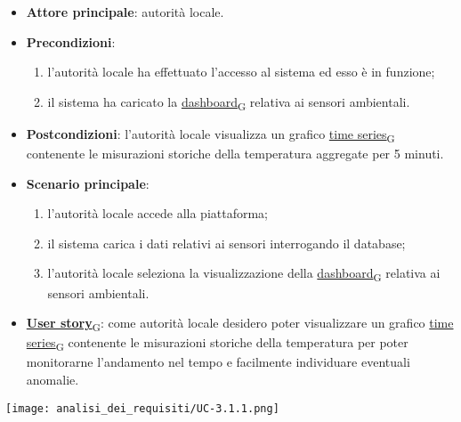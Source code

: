 \begin{itemize}
	\item \textbf{Attore principale}: autorità locale.
	\item \textbf{Precondizioni}:
	      \begin{enumerate}
		      \item l'autorità locale ha effettuato l'accesso al sistema ed esso è in funzione;
		      \item il sistema ha caricato la \href{https://7last.github.io/docs/pb/documentazione-interna/glossario\#dashboard}{dashboard\textsubscript{G}} relativa ai sensori ambientali.
	      \end{enumerate}
	\item \textbf{Postcondizioni}: l'autorità locale visualizza un grafico \href{https://7last.github.io/docs/pb/documentazione-interna/glossario\#time-series}{time series\textsubscript{G}} contenente le misurazioni storiche
	      della temperatura aggregate per 5 minuti.
	\item \textbf{Scenario principale}:
	      \begin{enumerate}
		      \item l'autorità locale accede alla piattaforma;
		      \item il sistema carica i dati relativi ai sensori interrogando il database;
		      \item l'autorità locale seleziona la visualizzazione della \href{https://7last.github.io/docs/pb/documentazione-interna/glossario\#dashboard}{dashboard\textsubscript{G}} relativa ai sensori ambientali.
	      \end{enumerate}
	\item \href{https://7last.github.io/docs/pb/documentazione-interna/glossario\#user-story}{\textbf{User story}\textsubscript{G}}: come autorità locale desidero poter visualizzare un grafico \href{https://7last.github.io/docs/pb/documentazione-interna/glossario\#time-series}{time series\textsubscript{G}} contenente le misurazioni storiche della temperatura
	      per poter monitorarne l'andamento nel tempo e facilmente individuare eventuali anomalie.
\end{itemize}
\begin{center}
	\texttt{[image: analisi\_dei\_requisiti/UC-3.1.1.png]}
\end{center}


